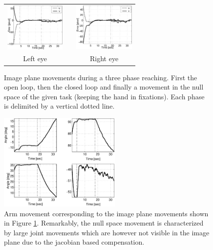 \begin{figure}
  \begin{center}
	\begin{tabular}{ccc}
	  \parbox{30mm}{\includegraphics[width=30mm]{Figure/RedundancyLeft.eps}}  & \hspace{.1cm} &
	  \parbox{30mm}{\includegraphics[width=30mm]{Figure/RedundancyRight.eps}}
	  \\
	  \parbox{30mm}{\centering Left eye } & \hspace{.1cm} & \parbox{30mm}{\centering Right eye }
  \end{tabular}
\end{center}
\caption{Image plane movements during a three phase reaching. 
First the open loop, then the closed loop and finally a movement 
in the null space of the given task (keeping the hand in fixations). 
Each phase is delimited by a vertical dotted line.
}\label{Fig:RedundancyImagePlane}
  \end{figure}
  
  \begin{figure}
  \begin{center}
	\includegraphics[width=60mm]{Figure/RedundancyArm.eps}
	\end{center}
\caption{Arm movement corresponding to the image plane movements shown in Figure \ref{Fig:RedundancyImagePlane}.
 Remarkably, the null space movement is characterized by large joint movements which are however not visible 
in the image plane due to the jacobian based compensation.} \label{Fig:RedundancyArm}
  \end{figure}